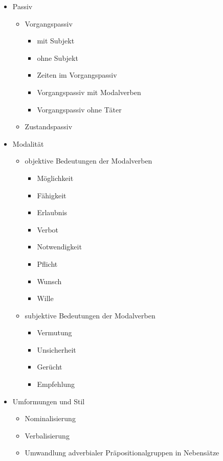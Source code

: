 \documentclass[a4paper]{article}
\begin{document}
\begin{itemize}
            \item Passiv
            \begin{itemize}
                \item Vorgangspassiv
                \begin{itemize}
                    \item mit Subjekt
                    \item ohne Subjekt
                    \item Zeiten im Vorgangspassiv
                    \item Vorgangspassiv mit Modalverben
                    \item Vorgangspassiv ohne Täter
                \end{itemize}
                
                \item Zustandspassiv
            \end{itemize}
            
            \item Modalität
            \begin{itemize}
                \item objektive Bedeutungen der Modalverben
                \begin{itemize}
                    \item Möglichkeit
                    \item Fähigkeit
                    \item Erlaubnis
                    \item Verbot
                    \item Notwendigkeit
                    \item Pflicht
                    \item Wunsch
                    \item Wille
                \end{itemize}
                
                \item subjektive Bedeutungen der Modalverben
                \begin{itemize}
                    \item Vermutung
                    \item Unsicherheit
                    \item Gerücht
                    \item Empfehlung
                \end{itemize}
            \end{itemize}
            
            \item Umformungen und Stil
            \begin{itemize}
                \item Nominalisierung
                \item Verbalisierung
                \item Umwandlung adverbialer Präpositionalgruppen in Nebensätze
            \end{itemize}
        \end{itemize}
%    
%    
\end{document}
